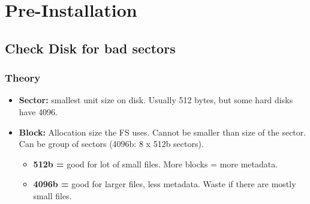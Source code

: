 \documentclass[10pt, a4paper, onecolumn, openany]{book} %
\begin{document}
\chapter{Pre-Installation}
\section{Check Disk for bad sectors}
\subsection{Theory}
\begin{itemize}
    \item \textbf{Sector:} smallest unit size on disk. Usually 512 bytes, but some hard disks have 4096.
    \item \textbf{Block:} Allocation size the FS uses. Cannot be smaller than size of the sector. Can be group of sectors (4096b: 8 x 512b sectors).
    \begin{itemize}
        \item \textbf{512b =} good for lot of small files. More blocks = more metadata.
        \item \textbf{4096b =}  good for larger files, less metadata. Waste if there are mostly small files.
    \end{itemize}
\end{itemize}
\end{document}
